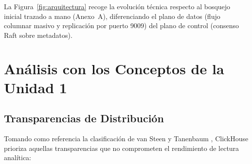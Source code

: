 \documentclass[12pt,a4paper]{article}
\begin{document}
La Figura~\ref{fig:arquitectura} recoge la evolución técnica respecto al bosquejo inicial trazado a mano (Anexo~A), diferenciando el plano de datos (flujo columnar masivo y replicación por puerto 9009) del plano de control (consenso Raft sobre metadatos).
\FloatBarrier

\section{Análisis con los Conceptos de la Unidad 1}

\subsection{Transparencias de Distribución}
Tomando como referencia la clasificación de van Steen y Tanenbaum \cite{vansteen2023distributed}, ClickHouse prioriza aquellas transparencias que no comprometen el rendimiento de lectura analítica:
\end{document}
